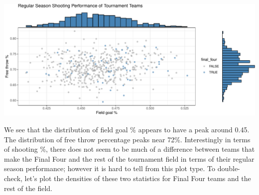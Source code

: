\documentclass[]{article}
\newenvironment{Shaded}{\begin{snugshade}}{\end{snugshade}}
\newcommand{\KeywordTok}[1]{\textcolor[rgb]{0.13,0.29,0.53}{\textbf{#1}}}
\newcommand{\DataTypeTok}[1]{\textcolor[rgb]{0.13,0.29,0.53}{#1}}
\newcommand{\DecValTok}[1]{\textcolor[rgb]{0.00,0.00,0.81}{#1}}
\newcommand{\FloatTok}[1]{\textcolor[rgb]{0.00,0.00,0.81}{#1}}
\newcommand{\StringTok}[1]{\textcolor[rgb]{0.31,0.60,0.02}{#1}}
\newcommand{\OperatorTok}[1]{\textcolor[rgb]{0.81,0.36,0.00}{\textbf{#1}}}
\newcommand{\ErrorTok}[1]{\textcolor[rgb]{0.64,0.00,0.00}{\textbf{#1}}}
\newcommand{\NormalTok}[1]{#1}
\begin{document}
\begin{Shaded}
\end{Shaded}

\includegraphics{EDA_files/figure-latex/unnamed-chunk-13-1.pdf}

We see that the distribution of field goal \% appears to have a peak
around 0.45. The distribution of free throw percentage peaks near 72\%.
Interestingly in terms of shooting \%, there does not seem to be much of
a difference between teams that make the Final Four and the rest of the
tournament field in terms of their regular season performance; however
it is hard to tell from this plot type. To double-check, let's plot the
densities of these two statistics for Final Four teams and the rest of
the field.
\end{document}
